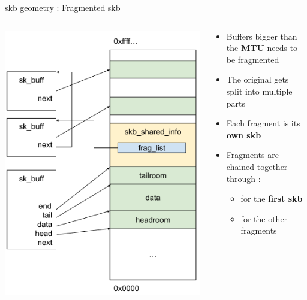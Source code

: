 \begin{frame}{skb geometry : Fragmented skb}
	\begin{columns}
		\begin{column}{0.3\textwidth}
			\includegraphics[width=\textwidth]{slides/networking-skb/fragmented_skb.pdf}
		\end{column}
		\begin{column}{0.7\textwidth}
			\begin{itemize}
				\item Buffers bigger than the \textbf{MTU} needs to be fragmented
				\item The original  gets split into multiple parts
				\item Each fragment is its \textbf{own skb}
				\item Fragments are chained together through :
					\begin{itemize}
						\item {} for the \textbf{first skb}
						\item {} for the other fragments
					\end{itemize}
			\end{itemize}
		\end{column}
	\end{columns}
\end{frame}


